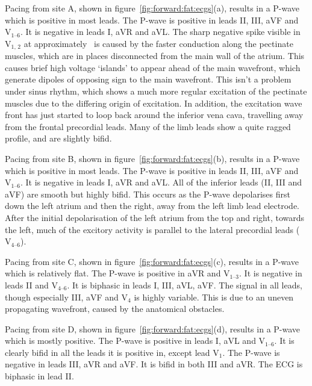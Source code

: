Pacing from site A, shown in figure~\ref{fig:forward:fat:ecgs}(a), results in a
P-wave which is positive in most leads.
The P-wave is positive in leads II, III, aVF and $\text{V}_{\text{1--6}}$.
It is negative in leads I, aVR and aVL.
The sharp negative spike visible in $\text{V}_{\text{1, 2}}$ at approximately
\ is caused by the faster conduction along the pectinate muscles, which
are in places disconnected from the main wall of the atrium.
This causes brief high voltage `islands' to appear ahead of the main wavefront,
which generate dipoles of opposing sign to the main wavefront.
This isn't a problem under sinus rhythm, which shows a much more regular
excitation of the pectinate muscles due to the differing origin of excitation.
In addition, the excitation wave front has just started to loop back around the
inferior vena cava, travelling away from the frontal precordial leads.
Many of the limb leads show a quite ragged profile, and are slightly bifid.

Pacing from site B, shown in figure~\ref{fig:forward:fat:ecgs}(b), results in a
P-wave which is positive in most leads.
The P-wave is positive in leads II, III, aVF and $\text{V}_{\text{1--6}}$.
It is negative in leads I, aVR and aVL.
All of the inferior leads (II, III and aVF) are smooth but highly bifid.
This occurs as the P-wave depolarises first down the left atrium and then the
right, away from the left limb lead electrode.
After the initial depolarisation of the left atrium from the top and right,
towards the left, much of the excitory activity is parallel to the lateral
precordial leads ($\text{V}_{\text{4--6}}$).

Pacing from site C, shown in figure~\ref{fig:forward:fat:ecgs}(c), results in a
P-wave which is relatively flat.
The P-wave is positive in aVR and $\text{V}_{\text{1--3}}$.
It is negative in leads II and $\text{V}_{\text{4--6}}$.
It is biphasic in leads I, III, aVL, aVF.
The signal in all leads, though especially III, aVF and $\text{V}_{\text{4}}$ is
highly variable.
This is due to an uneven propagating wavefront, caused by the anatomical
obstacles.

Pacing from site D, shown in figure~\ref{fig:forward:fat:ecgs}(d), results in a
P-wave which is mostly positive.
The P-wave is positive in leads I, aVL and $\text{V}_{\text{1--6}}$.
It is clearly bifid in all the leads it is positive in, except lead
$\text{V}_{\text{1}}$.
The P-wave is negative in leads III, aVR and aVF.
It is bifid in both III and aVR.
The ECG is biphasic in lead II.

